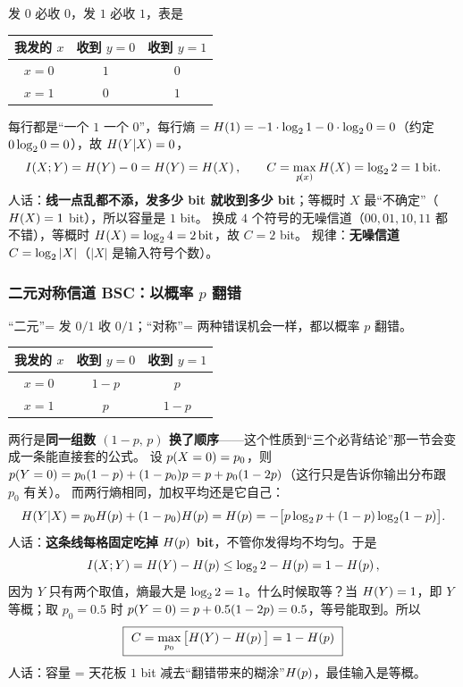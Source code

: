 发 $0$ 必收 $0$，发 $1$ 必收 $1$，表是

\begin{center}
\begin{tabular}{ccc}
\toprule
我发的 $x$ & 收到 $y=0$ & 收到 $y=1$ \\
\midrule
$x=0$ & $1$ & $0$ \\
$x=1$ & $0$ & $1$ \\
\bottomrule
\end{tabular}
\end{center}

每行都是“一个 $1$ 一个 $0$”，每行熵 $=H\!\left(1\right)=-1\cdot\log_{2}1-0\cdot\log_{2}0=0$（约定 $0\log_{2}0=0$），故 $H\!\left(Y|X\right)=0$，
\[
I\!\left(X;Y\right)=H\!\left(Y\right)-0=H\!\left(Y\right)=H\!\left(X\right),
\qquad
C=\max_{p\!\left(x\right)}H\!\left(X\right)=\log_{2}2=1\,\text{bit} .
\]
人话：\textbf{线一点乱都不添，发多少 bit 就收到多少 bit}；等概时 $X$ 最“不确定”（$H\!\left(X\right)=1$ bit），所以容量是 $1$ bit。
换成 $4$ 个符号的无噪信道（$00,01,10,11$ 都不错），等概时 $H\!\left(X\right)=\log_{2}4=2\,\text{bit}$，故 $C=2$ bit。
规律：\textbf{无噪信道 $C=\log_{2}|X|$}（$|X|$ 是输入符号个数）。

\subsubsection{二元对称信道 BSC：以概率 $p$ 翻错}

“二元”= 发 $0/1$ 收 $0/1$；“对称”= 两种错误机会一样，都以概率 $p$ 翻错。

\begin{center}
\begin{tabular}{ccc}
\toprule
我发的 $x$ & 收到 $y=0$ & 收到 $y=1$ \\
\midrule
$x=0$ & $1-p$ & $p$ \\
$x=1$ & $p$ & $1-p$ \\
\bottomrule
\end{tabular}
\end{center}

两行是\textbf{同一组数 $(1-p,\,p)$ 换了顺序}——这个性质到“三个必背结论”那一节会变成一条能直接套的公式。
设 $p\!\left(X=0\right)=p_0$，则 $p\!\left(Y=0\right)=p_0(1-p)+(1-p_0)p=p+p_0(1-2p)$（这行只是告诉你输出分布跟 $p_0$ 有关）。
而两行熵相同，加权平均还是它自己：
\[
H\!\left(Y|X\right)=p_0H\!\left(p\right)+(1-p_0)H\!\left(p\right)=H\!\left(p\right)
=-\big[p\log_{2} p+(1-p)\log_{2}(1-p)\big].
\]
人话：\textbf{这条线每格固定吃掉 $H\!\left(p\right)$ bit}，不管你发得均不均匀。于是
\[
I\!\left(X;Y\right)=H\!\left(Y\right)-H\!\left(p\right)\le\log_{2}2-H\!\left(p\right)=1-H\!\left(p\right),
\]
因为 $Y$ 只有两个取值，熵最大是 $\log_{2}2=1$。什么时候取等？当 $H\!\left(Y\right)=1$，即 $Y$ 等概；取 $p_0=0.5$ 时 $p\!\left(Y=0\right)=p+0.5(1-2p)=0.5$，等号能取到。所以
\[
\boxed{\ C=\max_{p_0}\big[\Hx{Y}-\Hx{p}\big]=1-\Hx{p}\ }
\]
人话：容量 = 天花板 $1$ bit 减去“翻错带来的糊涂”$H\!\left(p\right)$，最佳输入是等概。

